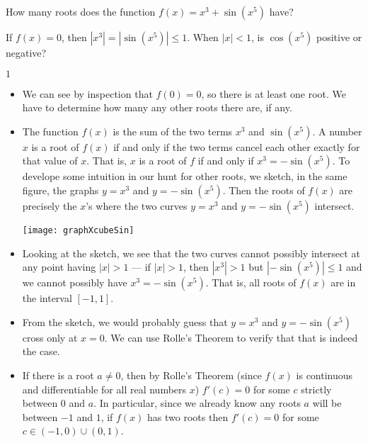 \begin{question}
How many roots does the function $f(x)=x^3+\sin\left(x^5\right)$ have?
\end{question}
\begin{hint}
If $f(x)=0$, then $|x^3|=\left|\sin\left(x^5\right)\right| \leq 1$. When $|x|<1$, is $\cos(x^5)$ positive or negative?
\end{hint}
\begin{answer}
$1$
\end{answer}
\begin{solution}
\begin{itemize}
\item 
We can see by inspection that $f(0)=0$, so there is at least one root.
We have to determine how many any other roots there are, if any.

\item 
The function $f(x)$ is the sum of the two terms $x^3$ and $\sin(x^5)$. 
A number $x$ is a root of $f(x)$ if and only if the two terms cancel each other exactly for that value of $x$. That is, $x$ is a root of $f$ if and 
only if $x^3=-\sin(x^5)$. To develope some intuition in our hunt for other 
roots, we sketch, in the same figure, the graphs $y=x^3$ and $y=-\sin(x^5)$.
Then the roots of $f(x)$ are precisely the $x$'s where the two curves $y=x^3$ and $y= -\sin(x^5)$ intersect.

\begin{center}
\texttt{[image: graphXcubeSin]}
\end{center} 

\item Looking at the sketch, we see that the two curves cannot possibly intersect at any point having $|x|>1$ --- if $|x|>1$, then $|x^3|>1$ but
$|-\sin (x^5)|\le 1$ and we cannot possibly have $x^3=-\sin(x^5)$.
That is, all roots of $f(x)$ are in the interval $[-1,1]$. 

\item 
From the sketch, we would probably guess that $y=x^3$ and $y=-\sin(x^5)$ 
cross only at $x=0$. We can use Rolle's Theorem to verify that that is 
indeed the case.

\item If there is a root $a \neq 0$, then by Rolle's Theorem (since $f(x)$ is continuous and differentiable for all real numbers $x$) $f'(c)=0$ for some $c$ strictly between $0$ and $a$. In particular, since we already know any roots $a$ will be between $-1$ and $1$, if $f(x)$ has two roots then $f'(c)=0$ for some $c \in (-1,0) \cup (0,1)$.


\end{itemize}
\end{solution}
